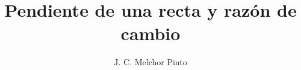 \documentclass[12pt,addpoints,answers]{guia}
\title{Pendiente de una recta y razón de cambio}
\author{J. C. Melchor Pinto}
\begin{document}
\pagestyle{headandfoot}

\INFO

\begin{questions}
    \questionboxed[15] 
    \questionboxed[15] 
    \questionboxed[15] 
\end{questions}
\end{document}
